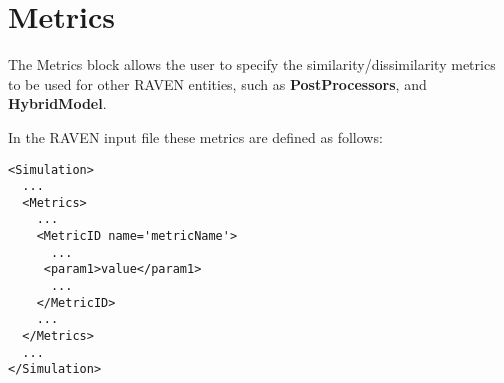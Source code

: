 
\section{Metrics}
\label{sec:Metrics}

\newcommand{\metrictypeI}[3]
{
  This metric interface directly with the metric available within \textit{#1}.
  The specifications of this metric must be defined within the XML block \xmlNode{#2}.
  This XML node needs to contain the following subnode:

  \begin{itemize}
    \item \xmlNode{metricType}\texttt{#3}\xmlNode{/metricType}, \xmlDesc{vertical bar (\texttt{|}) separated
      string, required field}.
  \end{itemize}

}
\newcommand{\metrictypeII}[3]
{
  \metrictypeI{#1}{#2}{#3}

  In addition to this XML subnode, the users can also specify the weights for given metric:
  \begin{itemize}
    \item \xmlNode{w}, \xmlDesc{comma separated floats, optional parameter}, the weights for each value in \textit{u}
      and \textit{v}. Default is None, which gives each value a weight of 1.0.
  \end{itemize}
}

\newcommand{\metrictypeIII}[3]
{
  \metrictypeI{#1}{#2}{#3}

  In addition to this XML subnode, the users can also specify the weights for given metric:
  \begin{itemize}
    \item \xmlNode{sample\_weight}, \xmlDesc{comma separated floats, optional parameter}, the weights for each value in \textit{u}
      and \textit{v}. Default is None, which gives each value a weight of 1.0.
  \end{itemize}
}

The Metrics block allows the user to specify the similarity/dissimilarity metrics to be used for other
RAVEN entities, such as \textbf{PostProcessors}, and \textbf{HybridModel}.

In the RAVEN input file these metrics are defined as follows:
\begin{lstlisting}[style=XML]
<Simulation>
  ...
  <Metrics>
    ...
    <MetricID name='metricName'>
      ...
     <param1>value</param1>
      ...
    </MetricID>
    ...
  </Metrics>
  ...
</Simulation>
\end{lstlisting}

